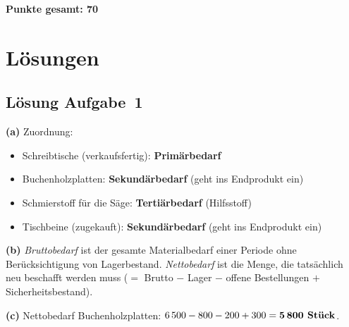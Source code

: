 \documentclass[11pt, a4paper]{article}
\begin{document}
\vspace{1em}
\noindent\textbf{Punkte gesamt: 70}

\newpage

\section{Lösungen}\label{loesungen}

\subsection*{Lösung Aufgabe~1}
\begin{loesung}
\textbf{(a)} Zuordnung:
\begin{itemize}[itemsep=0pt]
  \item Schreibtische (verkaufsfertig): \textbf{Primärbedarf}
  \item Buchenholzplatten: \textbf{Sekundärbedarf} (geht ins Endprodukt ein)
  \item Schmierstoff für die Säge: \textbf{Tertiärbedarf} (Hilfsstoff)
  \item Tischbeine (zugekauft): \textbf{Sekundärbedarf} (geht ins Endprodukt ein)
\end{itemize}

\textbf{(b)} \emph{Bruttobedarf} ist der gesamte Materialbedarf einer Periode ohne Berücksichtigung
von Lagerbestand. \emph{Nettobedarf} ist die Menge, die tatsächlich neu beschafft werden muss
($=$ Brutto $-$ Lager $-$ offene Bestellungen $+$ Sicherheitsbestand).

\textbf{(c)} Nettobedarf Buchenholzplatten:
$6\,500 - 800 - 200 + 300 = \textbf{5\,800 Stück}$.
\end{loesung}
\end{document}
